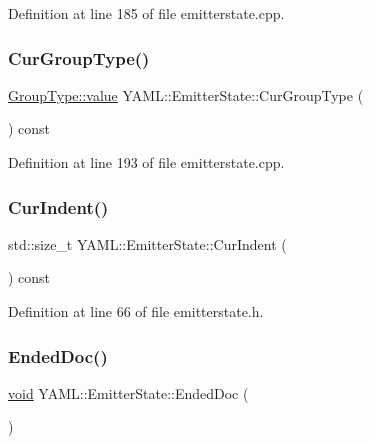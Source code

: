 Definition at line 185 of file emitterstate.\+cpp.

\mbox{\label{class_y_a_m_l_1_1_emitter_state_a5e454e1c001f137fbbb1cc07ee7827f2}} 
\subsubsection{\texorpdfstring{CurGroupType()}{CurGroupType()}}
{\footnotesize\ttfamily \mbox{\hyperlink{struct_y_a_m_l_1_1_group_type_aab9271cd8999a6694cb10670e6a5496f}{Group\+Type\+::value}} Y\+A\+M\+L\+::\+Emitter\+State\+::\+Cur\+Group\+Type (\begin{DoxyParamCaption}{ }\end{DoxyParamCaption}) const}



Definition at line 193 of file emitterstate.\+cpp.

\mbox{\label{class_y_a_m_l_1_1_emitter_state_a7600248c47211250bbd08af6366f391d}} 
\subsubsection{\texorpdfstring{CurIndent()}{CurIndent()}}
{\footnotesize\ttfamily std\+::size\+\_\+t Y\+A\+M\+L\+::\+Emitter\+State\+::\+Cur\+Indent (\begin{DoxyParamCaption}{ }\end{DoxyParamCaption}) const\hspace{0.3cm}{\ttfamily [inline]}}



Definition at line 66 of file emitterstate.\+h.

\mbox{\label{class_y_a_m_l_1_1_emitter_state_a9ceddaddfdec22c12efab293248746cd}} 
\subsubsection{\texorpdfstring{EndedDoc()}{EndedDoc()}}
{\footnotesize\ttfamily \mbox{\hyperlink{glad_8h_a950fc91edb4504f62f1c577bf4727c29}{void}} Y\+A\+M\+L\+::\+Emitter\+State\+::\+Ended\+Doc (\begin{DoxyParamCaption}{ }\end{DoxyParamCaption})}



